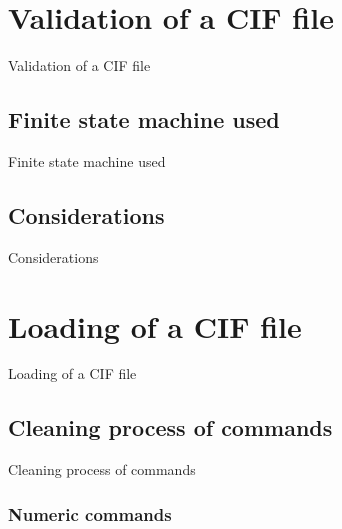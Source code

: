 \documentclass[11pt,twoside,openany,x11names,svgnames]{memoir}
\begin{document}
\section{Validation of a CIF file}\label{Validation-of-a-cif-file}

Validation of a CIF file

\subsection{Finite state machine used}\label{Finite-state-machine-used}

Finite state machine used

\subsection{Considerations}\label{Considerations}

Considerations

\section{Loading of a CIF file}\label{Loading-of-a-CIF-file}

Loading of a CIF file

\subsection{Cleaning process of commands}\label{Cleaning-process-of-commands}

Cleaning process of commands

\subsubsection{Numeric commands}\label{Numeric-commands}
\end{document}
